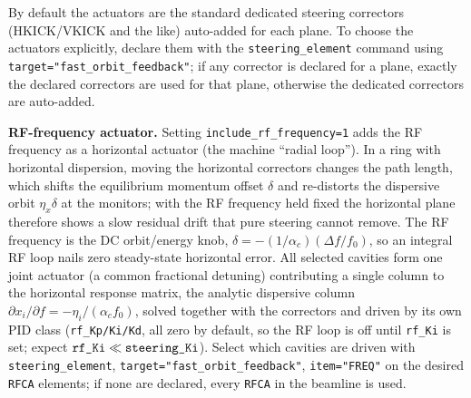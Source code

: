 \documentclass[11pt]{article}
\begin{document}
By default the actuators are the standard dedicated steering correctors (HKICK/VKICK and
the like) auto-added for each plane.  To choose the actuators explicitly, declare them
with the \verb|steering_element| command using \verb|target="fast_orbit_feedback"|; if any
corrector is declared for a plane, exactly the declared correctors are used for that
plane, otherwise the dedicated correctors are auto-added.

\textbf{RF-frequency actuator.}  Setting \verb|include_rf_frequency=1| adds the RF
frequency as a horizontal actuator (the machine ``radial loop'').  In a ring with
horizontal dispersion, moving the horizontal correctors changes the path length, which
shifts the equilibrium momentum offset $\delta$ and re-distorts the dispersive orbit
$\eta_x\delta$ at the monitors; with the RF frequency held fixed the horizontal plane
therefore shows a slow residual drift that pure steering cannot remove.  The RF frequency
is the DC orbit/energy knob, $\delta=-(1/\alpha_c)(\Delta f/f_0)$, so an integral RF loop
nails zero steady-state horizontal error.  All selected cavities form one joint actuator
(a common fractional detuning) contributing a single column to the horizontal response
matrix, the analytic dispersive column $\partial x_i/\partial f=-\eta_i/(\alpha_c f_0)$,
solved together with the correctors and driven by its own PID class (\verb|rf_Kp/Ki/Kd|,
all zero by default, so the RF loop is off until \verb|rf_Ki| is set; expect
$\verb|rf_Ki|\ll\verb|steering_Ki|$).  Select which cavities are driven with
\verb|steering_element|, \verb|target="fast_orbit_feedback"|, \verb|item="FREQ"| on the
desired \verb|RFCA| elements; if none are declared, every \verb|RFCA| in the beamline is
used.
\end{document}
